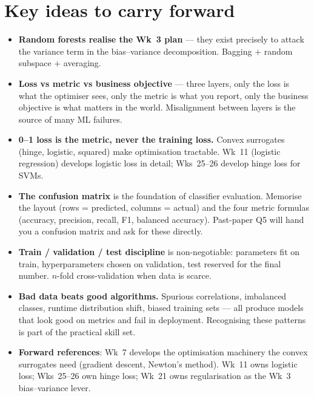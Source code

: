 \documentclass[11pt, a4paper]{article}
\begin{document}
\section*{Key ideas to carry forward}

\begin{tldrbox}
\begin{itemize}[leftmargin=*]
  \item \textbf{Random forests realise the Wk~3 plan} — they exist precisely to attack the variance term in the bias--variance decomposition. Bagging $+$ random subspace $+$ averaging.
  \item \textbf{Loss vs metric vs business objective} — three layers, only the loss is what the optimiser sees, only the metric is what you report, only the business objective is what matters in the world. Misalignment between layers is the source of many ML failures.
  \item \textbf{0--1 loss is the metric, never the training loss.} Convex surrogates (hinge, logistic, squared) make optimisation tractable. Wk~11 (logistic regression) develops logistic loss in detail; Wks~25--26 develop hinge loss for SVMs.
  \item \textbf{The confusion matrix} is the foundation of classifier evaluation. Memorise the layout (rows = predicted, columns = actual) and the four metric formulas (accuracy, precision, recall, F1, balanced accuracy). Past-paper Q5 will hand you a confusion matrix and ask for these directly.
  \item \textbf{Train / validation / test discipline} is non-negotiable: parameters fit on train, hyperparameters chosen on validation, test reserved for the final number. $n$-fold cross-validation when data is scarce.
  \item \textbf{Bad data beats good algorithms.} Spurious correlations, imbalanced classes, runtime distribution shift, biased training sets — all produce models that look good on metrics and fail in deployment. Recognising these patterns is part of the practical skill set.
  \item \textbf{Forward references}: Wk~7 develops the optimisation machinery the convex surrogates need (gradient descent, Newton's method). Wk~11 owns logistic loss; Wks~25--26 own hinge loss; Wk~21 owns regularisation as the Wk~3 bias--variance lever.
\end{itemize}
\end{tldrbox}
\end{document}
